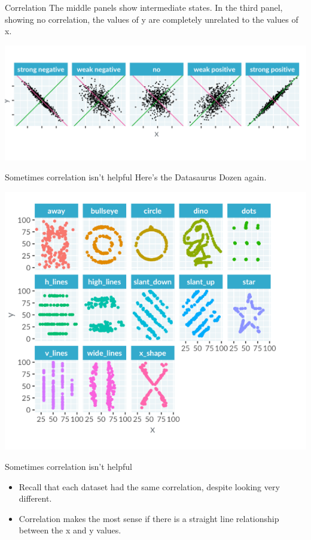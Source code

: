 \documentclass[
  ignorenonframetext,
]{beamer}
\begin{document}
\begin{frame}{Correlation}
\label{correlation-10}
The middle panels show intermediate states. In the third panel, showing
no correlation, the values of y are completely unrelated to the values
of x.

\includegraphics{../images/im34.png}
\end{frame}

\begin{frame}{Sometimes correlation isn't helpful}
\label{sometimes-correlation-isnt-helpful}
Here's the Datasaurus Dozen again.

\includegraphics{../images/im35.png}
\end{frame}

\begin{frame}{Sometimes correlation isn't helpful}
\label{sometimes-correlation-isnt-helpful-1}
\begin{itemize}
\item
  Recall that each dataset had the same correlation, despite looking
  very different.
\item
  Correlation makes the most sense if there is a straight line
  relationship between the x and y values.
\end{itemize}
\end{frame}
\end{document}
